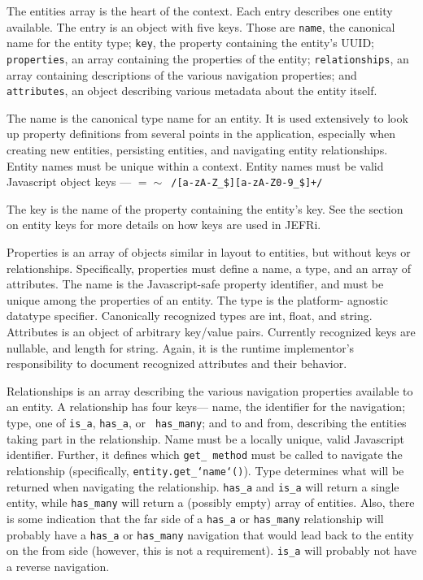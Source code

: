 \documentclass{article}
\newcommand{\ilcode}{\tt}
\begin{document}
The entities array is the heart of the context. Each entry describes one entity
available. The entry is an object with five keys. Those are {\ilcode name}, the
canonical name for the entity type; {\ilcode key}, the property containing the
entity's UUID; {\ilcode properties}, an array containing the properties of the
entity; {\ilcode relationships}, an array containing descriptions of the various
navigation properties; and {\ilcode attributes}, an object describing various
metadata about the entity itself.

The name is the canonical type name for an entity. It is used extensively to
look up property definitions from several points in the application, especially
when creating new entities, persisting entities, and navigating entity
relationships. Entity names must be unique within a context. Entity names must
be valid Javascript object keys ---
{\ilcode $=\sim$ /[a-zA-Z\_\$][a-zA-Z0-9\_\$]+/}

The key is the name of the property containing the entity's key. See the
section on entity keys for more details on how keys are used in JEFRi.

Properties is an array of objects similar in layout to entities, but without
keys or relationships. Specifically, properties must define a name, a type, and
an array of attributes. The name is the Javascript-safe property identifier, and
must be unique among the properties of an entity. The type is the platform-
agnostic datatype specifier. Canonically recognized types are int, float, and
string. Attributes is an object of arbitrary key/value pairs. Currently
recognized keys are nullable, and length for string. Again, it is the runtime
implementor's responsibility to document recognized attributes and their
behavior.

Relationships is an array describing the various navigation properties available
to an entity. A relationship has four keys--- name, the identifier for the
navigation; type, one of {\ilcode is\_a}, {\ilcode has\_a}, or {\ilcode
has\_many}; and to and from, describing the entities taking part in the
relationship. Name must be a locally unique, valid Javascript identifier.
Further, it defines which {\ilcode get\_ method} must be called to navigate the
relationship (specifically, {\ilcode entity.get\_`name`()}). Type determines
what will be returned when navigating the relationship. {\ilcode has\_a} and
{\ilcode is\_a} will return a single entity, while {\ilcode has\_many} will
return a (possibly empty) array of entities. Also, there is some indication that
the far side of a {\ilcode has\_a} or {\ilcode has\_many} relationship will
probably have a {\ilcode has\_a} or {\ilcode has\_many} navigation that would
lead back to the entity on the from side (however, this is not a requirement).
{\ilcode is\_a} will probably not have a reverse navigation.
\end{document}
